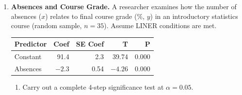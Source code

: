 \documentclass[10pt]{article}
\begin{document}
\begin{enumerate}
\begin{enumerate}[label=\alph*.]
          \item Interpret the $p$-value in context.


          \item State a conclusion at $\alpha = 0.05$.

        \end{enumerate}

  \item \textbf{Absences and Course Grade.} A researcher examines how the number of absences
        ($x$) relates to final course grade ($\%$, $y$) in an introductory statistics course
        (random sample, $n = 35$). Assume LINER conditions are met.

        \begin{center}
        \renewcommand{\arraystretch}{1.4}
        \begin{tabular}{lrrrr}
            \textbf{Predictor} & \textbf{Coef} & \textbf{SE Coef} & \textbf{T} & \textbf{P} \\
            \hline
            Constant  & 91.4 & 2.3  & 39.74 & 0.000 \\
            Absences  & $-2.3$ & 0.54 & $-4.26$ & 0.000 \\
        \end{tabular}
        \end{center}

        \begin{enumerate}[label=\alph*.]
          \item Carry out a complete 4-step significance test at $\alpha = 0.05$.


\end{enumerate}
\end{enumerate}
\end{document}
